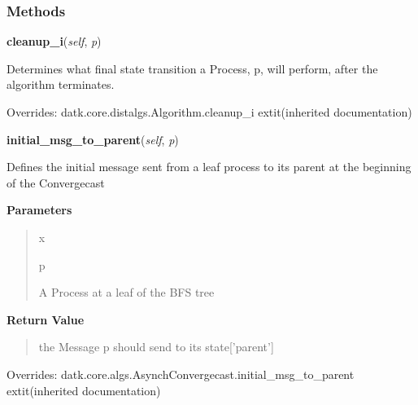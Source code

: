 
  \subsubsection{Methods}

    \vspace{0.5ex}

\hspace{.8\funcindent}\begin{boxedminipage}{\funcwidth}

    \raggedright \textbf{cleanup\_i}(\textit{self}, \textit{p})

\setlength{\parskip}{2ex}
    Determines what final state transition a Process, p, will perform, 
    after the algorithm terminates.

\setlength{\parskip}{1ex}
      Overrides: datk.core.distalgs.Algorithm.cleanup\_i 	extit{(inherited documentation)}

    \end{boxedminipage}

    \vspace{0.5ex}

\hspace{.8\funcindent}\begin{boxedminipage}{\funcwidth}

    \raggedright \textbf{initial\_msg\_to\_parent}(\textit{self}, \textit{p})

\setlength{\parskip}{2ex}
    Defines the initial message sent from a leaf process to its parent at 
    the beginning of the Convergecast

\setlength{\parskip}{1ex}
      \textbf{Parameters}
      \vspace{-1ex}

      \begin{quote}
        \begin{Ventry}{x}

          \item[p]

          A Process at a leaf of the BFS tree

        \end{Ventry}

      \end{quote}

      \textbf{Return Value}
    \vspace{-1ex}

      \begin{quote}
      the Message p should send to its state['parent']

      \end{quote}

      Overrides: datk.core.algs.AsynchConvergecast.initial\_msg\_to\_parent 	extit{(inherited documentation)}

    \end{boxedminipage}

